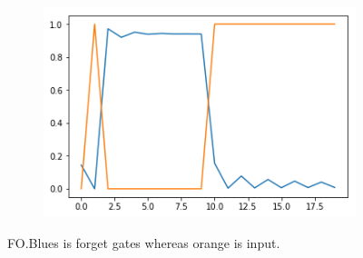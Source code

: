 \documentclass[12pt, letterpaper]{article}
\begin{document}
\begin{figure}[h]
\begin{subfigure}[b]{0.3\textwidth}
        \includegraphics[width=\textwidth]{fo_f3}
        \label{fig:mouse}
    \end{subfigure}
    \caption{FO.Blues is forget gates whereas orange is input.}\label{fig:animals}
\end{figure}
\end{document}
